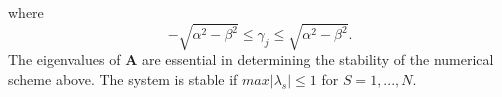 \documentclass[12pt]{article}
\numberwithin{equation}{subsection} %
\begin{document}
where
\begin{equation*}
-\sqrt{\alpha^2-\beta^2}\leq \gamma_j\leq\sqrt{\alpha^2-\beta^2}.
\end{equation*}
The eigenvalues of \textbf{A} are essential in determining the
stability of the numerical scheme above. The system is stable if
$max|\lambda_s | \leq 1$ for $S=1,...,N$.


\end{document}
